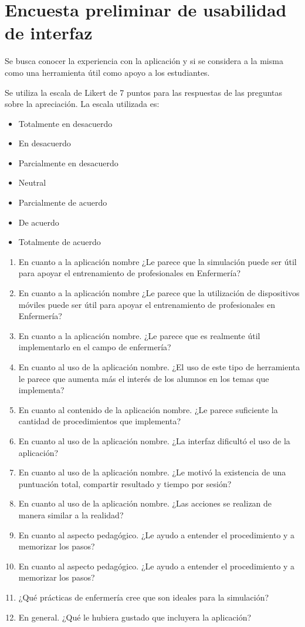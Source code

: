 \section{Encuesta preliminar de usabilidad de interfaz}

Se busca conocer la experiencia con la aplicación y si se considera a la misma
como una herramienta útil como apoyo a los estudiantes.

Se utiliza la escala de Likert de 7 puntos para las respuestas de las preguntas
sobre la apreciación. La escala utilizada es:

\begin{itemize}
    \item Totalmente en desacuerdo
    \item En desacuerdo
    \item Parcialmente en desacuerdo
    \item Neutral
    \item Parcialmente de acuerdo
    \item De acuerdo
    \item Totalmente de acuerdo
\end{itemize}

\begin{enumerate}
\item En cuanto a la aplicación \gls{nombre} ¿Le parece que la simulación puede
    ser útil para apoyar el entrenamiento de profesionales en Enfermería?
\item En cuanto a la aplicación \gls{nombre} ¿Le parece que la utilización de
    dispositivos móviles puede ser útil para apoyar el entrenamiento de
    profesionales en Enfermería?
\item En cuanto a la aplicación \gls{nombre}. ¿Le parece que es realmente útil
    implementarlo en el campo de enfermería?
\item En cuanto al uso de la aplicación \gls{nombre}. ¿El uso de este tipo de
    herramienta le parece que aumenta más el interés de los alumnos en los temas
    que implementa?
\item En cuanto al contenido de la aplicación \gls{nombre}. ¿Le parece
    suficiente la cantidad de procedimientos que implementa?
\item En cuanto al uso de la aplicación \gls{nombre}. ¿La interfaz dificultó el
    uso de la aplicación?
\item En cuanto al uso de la aplicación \gls{nombre}. ¿Le motivó la existencia
    de una puntuación total, compartir resultado y tiempo por sesión?
\item En cuanto al uso de la aplicación \gls{nombre}. ¿Las acciones se realizan
    de manera similar a la realidad?
\item En cuanto al aspecto pedagógico. ¿Le ayudo a entender el procedimiento y a
    memorizar los pasos?
\item En cuanto al aspecto pedagógico. ¿Le ayudo a entender el procedimiento y a
    memorizar los pasos?
\item ¿Qué prácticas de enfermería cree que son ideales para la simulación?
\item En general. ¿Qué le hubiera gustado que incluyera la aplicación?
\end{enumerate}

